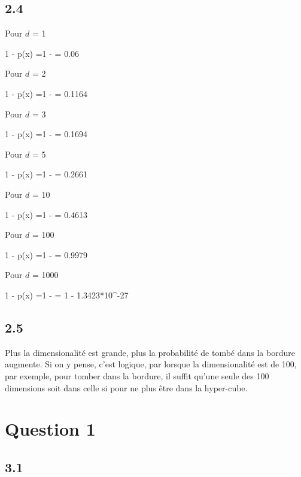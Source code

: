 \documentclass[12pt]{article}
\newenvironment{eqs*}{\begin{equation*}\begin{aligned}}{\end{aligned}\end{equation*}}
\begin{document}
\subsection{2.4}
Pour $d$ = 1
\begin{eqs*}
1 - p(x) =1 -  = 0.06
\end{eqs*}

Pour $d$ = 2
\begin{eqs*}
1 - p(x) =1 -  = 0.1164
\end{eqs*}

Pour $d$ = 3
\begin{eqs*}
1 - p(x) =1 -  = 0.1694
\end{eqs*}

Pour $d$ = 5
\begin{eqs*}
1 - p(x) =1 -  = 0.2661
\end{eqs*}

Pour $d$ = 10
\begin{eqs*}
1 - p(x) =1 -  = 0.4613
\end{eqs*}

Pour $d$ = 100
\begin{eqs*}
1 - p(x) =1 -  = 0.9979
\end{eqs*}

Pour $d$ = 1000
\begin{eqs*}
1 - p(x) =1 -  = 1 - 1.3423*10^{-27}
\end{eqs*}

\newpage
\subsection{2.5}

Plus la dimensionalité est grande, plus la probabilité de tombé dans la bordure augmente. Si on y pense, c'est logique, par lorsque la dimensionalité est de 
100, par exemple, pour tomber dans la bordure, il suffit qu'une seule des 100 dimensions soit dans celle si pour ne plus être dans la hyper-cube. 

\section{Question 1}
\subsection{3.1}
\end{document}
